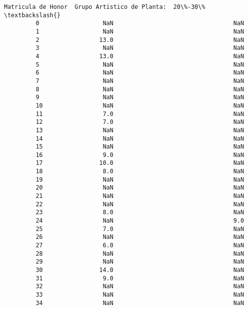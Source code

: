 \documentclass[11pt]{article}
\begin{document}
\begin{Verbatim}[commandchars=\\\{\}]
             Matricula de Honor  Grupo Artistico de Planta:  20\%-30\%  \textbackslash{}
         0                  NaN                                  NaN   
         1                  NaN                                  NaN   
         2                 13.0                                  NaN   
         3                  NaN                                  NaN   
         4                 13.0                                  NaN   
         5                  NaN                                  NaN   
         6                  NaN                                  NaN   
         7                  NaN                                  NaN   
         8                  NaN                                  NaN   
         9                  NaN                                  NaN   
         10                 NaN                                  NaN   
         11                 7.0                                  NaN   
         12                 7.0                                  NaN   
         13                 NaN                                  NaN   
         14                 NaN                                  NaN   
         15                 NaN                                  NaN   
         16                 9.0                                  NaN   
         17                10.0                                  NaN   
         18                 8.0                                  NaN   
         19                 NaN                                  NaN   
         20                 NaN                                  NaN   
         21                 NaN                                  NaN   
         22                 NaN                                  NaN   
         23                 8.0                                  NaN   
         24                 NaN                                  9.0   
         25                 7.0                                  NaN   
         26                 NaN                                  NaN   
         27                 6.0                                  NaN   
         28                 NaN                                  NaN   
         29                 NaN                                  NaN   
         30                14.0                                  NaN   
         31                 9.0                                  NaN   
         32                 NaN                                  NaN   
         33                 NaN                                  NaN   
         34                 NaN                                  NaN   

\end{Verbatim}
\end{document}
